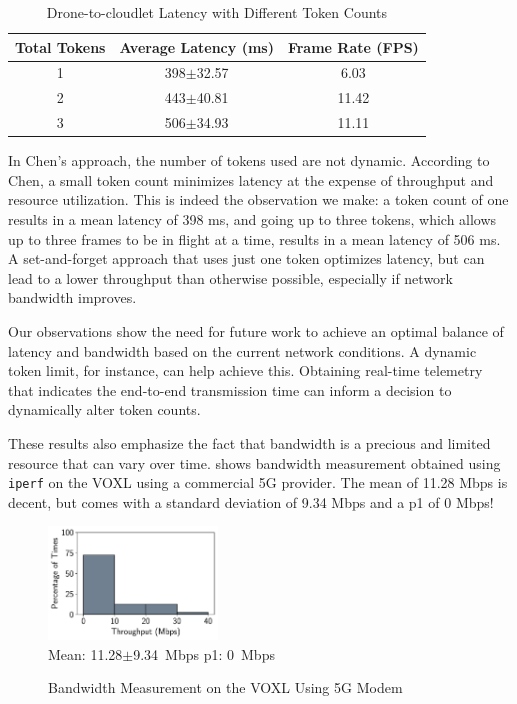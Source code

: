 \begin{table}[htbp]
    \centering
    \begin{tabular}{@{}ccc@{}}
        \toprule
        \textbf{Total Tokens} & \textbf{Average Latency (ms)} & \textbf{Frame Rate (FPS)}\\
        \midrule
        1 &  398$\pm$\small{32.57} & 6.03\\
        2 & 443$\pm$\small{40.81} & 11.42\\
        3 & 506$\pm$\small{34.93} & 11.11\\
        \bottomrule

    \end{tabular}
    \caption{Drone-to-cloudlet Latency with Different Token Counts}
    \label{tab:token-latency}
\end{table}

In Chen's approach, the number of tokens used are not dynamic. According to
Chen, a small token count minimizes latency at the expense of throughput and
resource utilization. This is indeed the observation we make: a token count of
one results in a mean latency of 398 ms, and going up to three tokens, which
allows up to three frames to be in flight at a time, results in a mean latency
of 506 ms. A set-and-forget approach that uses just one token optimizes latency,
but can lead to a lower throughput than otherwise possible, especially if
network bandwidth improves.

Our observations show the need for future work to achieve an optimal balance of
latency and bandwidth based on the current network conditions. A dynamic token
limit, for instance, can help achieve this. Obtaining real-time telemetry that
indicates the end-to-end transmission time can inform a decision to dynamically
alter token counts.

These results also emphasize the fact that bandwidth is a precious and limited
resource that can vary over time.  shows bandwidth measurement obtained using
\texttt{iperf} on the VOXL using a commercial 5G provider. The mean of 11.28 Mbps
is decent, but comes with a standard deviation of 9.34 Mbps and a p1 of 0 Mbps!

\begin{figure}[htbp]
    \centering
    \includegraphics[width=0.4\textwidth]{figs/bw_out.pdf}\\
    \small{Mean: 11.28$\pm$9.34~Mbps\; p1: 0~Mbps}\\
    \caption{Bandwidth Measurement on the VOXL Using 5G Modem}
    \label{fig:voxl-bw-measurement}
\end{figure}

